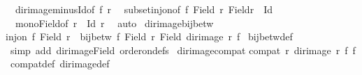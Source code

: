 \begin{isabellebody}
\ \ dir{\isacharunderscore}{\kern0pt}image{\isacharunderscore}{\kern0pt}minus{\isacharunderscore}{\kern0pt}Id{\isacharbrackleft}{\kern0pt}of\ f\ r{\isacharbrackright}{\kern0pt}\isanewline
\ \ subset{\isacharunderscore}{\kern0pt}inj{\isacharunderscore}{\kern0pt}on{\isacharbrackleft}{\kern0pt}of\ f\ {\isachardoublequoteopen}Field\ r{\isachardoublequoteclose}\ {\isachardoublequoteopen}Field{\isacharparenleft}{\kern0pt}r\ {\isacharminus}{\kern0pt}\ Id{\isacharparenright}{\kern0pt}{\isachardoublequoteclose}{\isacharbrackright}{\kern0pt}\isanewline
\ \ mono{\isacharunderscore}{\kern0pt}Field{\isacharbrackleft}{\kern0pt}of\ {\isachardoublequoteopen}r\ {\isacharminus}{\kern0pt}\ Id{\isachardoublequoteclose}\ r{\isacharbrackright}{\kern0pt}\ \isamarkupfalse%
\ auto%
\endisatagproof
{\isafoldproof}%
%
\isadelimproof
\isanewline
%
\endisadelimproof
\isanewline
{}\isamarkupfalse%
\ dir{\isacharunderscore}{\kern0pt}image{\isacharunderscore}{\kern0pt}bij{\isacharunderscore}{\kern0pt}betw{\isacharcolon}{\kern0pt}\isanewline
{\isachardoublequoteopen}{\isasymlbrakk}inj{\isacharunderscore}{\kern0pt}on\ f\ {\isacharparenleft}{\kern0pt}Field\ r{\isacharparenright}{\kern0pt}{\isasymrbrakk}\ {\isasymLongrightarrow}\ bij{\isacharunderscore}{\kern0pt}betw\ f\ {\isacharparenleft}{\kern0pt}Field\ r{\isacharparenright}{\kern0pt}\ {\isacharparenleft}{\kern0pt}Field\ {\isacharparenleft}{\kern0pt}dir{\isacharunderscore}{\kern0pt}image\ r\ f{\isacharparenright}{\kern0pt}{\isacharparenright}{\kern0pt}{\isachardoublequoteclose}\isanewline
%
\isadelimproof
%
\endisadelimproof
%
\isatagproof
{}\isamarkupfalse%
\ bij{\isacharunderscore}{\kern0pt}betw{\isacharunderscore}{\kern0pt}def\ \isamarkupfalse%
\ {\isacharparenleft}{\kern0pt}simp\ add{\isacharcolon}{\kern0pt}\ dir{\isacharunderscore}{\kern0pt}image{\isacharunderscore}{\kern0pt}Field\ order{\isacharunderscore}{\kern0pt}on{\isacharunderscore}{\kern0pt}defs{\isacharparenright}{\kern0pt}%
\endisatagproof
{\isafoldproof}%
%
\isadelimproof
\isanewline
%
\endisadelimproof
\isanewline
{}\isamarkupfalse%
\ dir{\isacharunderscore}{\kern0pt}image{\isacharunderscore}{\kern0pt}compat{\isacharcolon}{\kern0pt}\isanewline
{\isachardoublequoteopen}compat\ r\ {\isacharparenleft}{\kern0pt}dir{\isacharunderscore}{\kern0pt}image\ r\ f{\isacharparenright}{\kern0pt}\ f{\isachardoublequoteclose}\isanewline
%
\isadelimproof
%
\endisadelimproof
%
\isatagproof
{}\isamarkupfalse%
\ compat{\isacharunderscore}{\kern0pt}def\ dir{\isacharunderscore}{\kern0pt}image{\isacharunderscore}{\kern0pt}def\ \isamarkupfalse%

\end{isabellebody}
